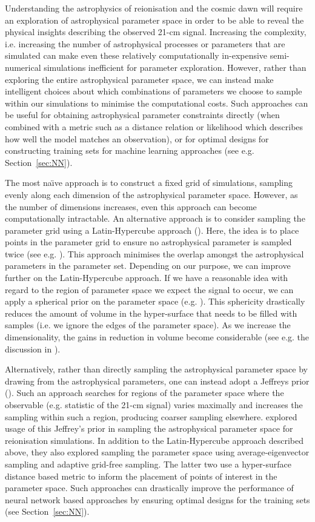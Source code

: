Understanding the astrophysics of reionisation and the cosmic dawn will require an exploration of astrophysical parameter space in order to be able to reveal the physical insights describing the observed 21-cm signal. Increasing the complexity, i.e. increasing the number of astrophysical processes or parameters that are simulated can make even these relatively computationally in-expensive semi-numerical simulations inefficient for parameter exploration. However, rather than exploring the entire astrophysical parameter space, we can instead make intelligent choices about which combinations of parameters we choose to sample within our simulations to minimise the computational costs. Such approaches can be useful for obtaining astrophysical parameter constraints directly (when combined with a metric such as a distance relation or likelihood which describes how well the model matches an observation), or for optimal designs for constructing training sets for machine learning approaches (see e.g. Section~\ref{sec:NN}). 

The most na\"{\i}ve approach is to construct a fixed grid of simulations, sampling evenly along each dimension of the astrophysical parameter space. However, as the number of dimensions increases, even this approach can become computationally intractable. An alternative approach is to consider sampling the parameter grid using a Latin-Hypercube approach (\cite{McKay:1979}). Here, the idea is to place points in the parameter grid to ensure no astrophysical parameter is sampled twice (see e.g. \cite{Kern:2017,Schmit:2018}). This approach minimises the overlap amongst the astrophysical parameters in the parameter set. Depending on our purpose, we can improve further on the Latin-Hypercube approach. If we have a reasonable idea with regard to the region of parameter space we expect the signal to occur, we can apply a spherical prior on the parameter space (e.g. \cite{Schneider:2011}). This sphericity drastically reduces the amount of volume in the hyper-surface that needs to be filled with samples (i.e. we ignore the edges of the parameter space). As we increase the dimensionality, the gains in reduction in volume become considerable (see e.g. the discussion in \cite{Kern:2017}).

Alternatively, rather than directly sampling the astrophysical parameter space by drawing from the astrophysical parameters, one can instead adopt a Jeffreys prior (\cite{Jeffreys:1946}). Such an approach searches for regions of the parameter space where the observable (e.g. statistic of the 21-cm signal) varies maximally and increases the sampling within such a region, producing coarser sampling elsewhere. \cite{Eames:2018} explored usage of this Jeffrey's prior in sampling the astrophysical parameter space for reionisation simulations. In addition to the Latin-Hypercube approach described above, they also explored sampling the parameter space using average-eigenvector sampling and adaptive grid-free sampling. The latter two use a hyper-surface distance based metric to inform the placement of points of interest in the parameter space. Such approaches can drastically improve the performance of neural network based approaches by ensuring optimal designs for the training sets (see Section~\ref{sec:NN}).

